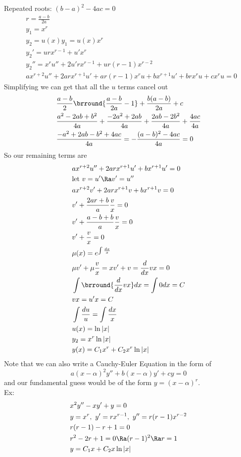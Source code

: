 Repeated roots: $(b-a)^2-4ac=0$
\begin{align*}
    &r=\frac{a-b}{2a}\\
    &y_1=x^{r}\\
    &y_2=u(x)y_1=u(x)x^r\\
    &y_2'=urx^{r-1}+u'x^r\\
    &y_2''=x^ru''+2u'rx^{r-1}+ur(r-1)x^{r-2}\\
    &ax^{r+2}u''+2arx^{r+1}u'+ar(r-1)x^ru+bx^{r+1}u'+brx^ru+cx^ru=0
\end{align*}
Simplifying we can get that all the $u$ terms cancel out
\begin{align*}
    &\frac{a-b}{2}\brround{\frac{a-b}{2a}-1}+\frac{b(a-b)}{2a}+c\\
    &\frac{a^2-2ab+b^2}{4a}+\frac{-2a^2+2ab}{4a}+\frac{2ab-2b^2}{4a}+\frac{4ac}{4a}\\
    &\frac{-a^2+2ab-b^2+4ac}{4a}=-\frac{(a-b)^2-4ac}{4a}=0
\end{align*}
So our remaining terms are
\begin{align*}
    &ax^{r+2}u''+2arx^{r+1}u'+bx^{r+1}u'=0\\
    &\text{let }v=u'\Ra v'=u''\\
    &ax^{r+2}v'+2arx^{r+1}v+bx^{r+1}v=0\\
    &v'+\frac{2ar+b}{a}\frac{v}{x}=0\\
    &v'+\frac{a-b+b}{a}\frac{v}{x}=0\\
    &v'+\frac{v}{x}=0\\
    &\mu(x)=e^{\int\frac{dx}{x}}\\
    &\mu v'+\mu\frac{v}{x}=xv'+v=\frac{d}{dx}vx=0\\
    &\int\brround{\frac{d}{dx}vx}dx=\int0dx=C\\
    &vx=u'x=C\\
    &\int\frac{du}{u}=\int\frac{dx}{x}\\
    &u(x)=\ln|x|\\
    &y_2=x^r\ln|x|\\
    &y(x)=C_1x^r+C_2x^r\ln|x|
\end{align*}
Note that we can also write a Cauchy-Euler Equation in the form of
$$a(x-\alpha)^2y''+b(x-\alpha)y'+cy=0$$
and our fundamental guess would be of the form $y=(x-\alpha)^r$.\\
Ex:
\begin{align*}
    &x^2y''-xy'+y=0\\
    &y=x^r,\ y'=rx^{r-1},\ y''=r(r-1)x^{r-2}\\
    &r(r-1)-r+1=0\\
    &r^2-2r+1=0\Ra (r-1)^2\Ra r=1\\
    &y=C_1x+C_2x\ln|x|
\end{align*}
